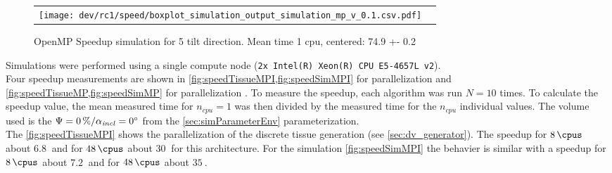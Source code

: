 %
\begin{figure}[!t]
\centering
%
\begin{lrbox}{\newtable}
\end{lrbox}
%
\begin{tabular}{cc}
\begin{minipage}{0.6\textwidth}
\texttt{[image: dev/rc1/speed/boxplot\_simulation\_output\_simulation\_mp\_v\_0.1.csv.pdf]}
\end{minipage}
&
\begin{minipage}{0.25\textwidth}
\usebox{\newtable}
\end{minipage}
\end{tabular}
\caption[]{OpenMP Speedup simulation for 5 tilt direction. Mean time 1 cpu, centered: 74.9 +- 0.2}
\label{fig:speedSimMP}
\end{figure}
%
Simulations were performed using a single compute node (\texttt{2x Intel(R) Xeon(R) CPU E5-4657L v2}).
\\
%
Four speedup measurements are shown in \cref{fig:speedTissueMPI,fig:speedSimMPI} for parallelization \mpi{} and \cref{fig:speedTissueMP,fig:speedSimMP} for parallelization \openmp{}.
To measure the speedup, each algorithm was run $N=10$ times.
To calculate the speedup value, the mean measured time for $n_\mathit{cpu}=1$ was then divided by the measured time for the $n_\mathit{cpu}$ individual values.
The volume used is the $\textnormal{$\Psi$}=\SI{0}{\percent} / \textnormal{$\alpha_{\mathit{incl}}$}=\SI{0}{\degree}$ from the \cref{sec:simParameterEnv} parameterization.
\\
%
The \cref{fig:speedTissueMPI} shows the parallelization of the discrete tissue generation (see \cref{sec:dv_generator}).
The speedup for $\SI{8}{\cpus}$ about $\SI{6.8}{}$ and for $\SI{48}{\cpus}$ about $\SI{30}{}$ for this architecture.
For the simulation \cref{fig:speedSimMPI} the behavier is similar with a speedup for $\SI{8}{\cpus}$ about $\SI{7.2}{}$ and for $\SI{48}{\cpus}$ about $\SI{35}{}$.
